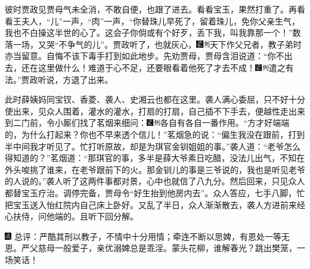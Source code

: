 彼时贾政见贾母气未全消，不敢自便，也跟了进去。看看宝玉，果然打重了。再看看王夫人，``儿''一声，``肉''一声，``你替珠儿早死了，留着珠儿，免你父亲生气，我也不白操这半世的心了。这会子你倘或有个好歹，丢下我，叫我靠那一个！''数落一场，又哭``不争气的儿''。贾政听了，也就灰心，{\includegraphics[width=3mm]{../Images/00006}\includegraphics[width=3mm]{../Images/00011}\footnotesize \kaishu 天下作父兄者，教子弟时亦当留意。}自悔不该下毒手打到如此地步。先劝贾母，贾母含泪说道：``你不出去，还在这里做什么！难道于心不足，还要眼看着他死了才去不成！{\includegraphics[width=3mm]{../Images/00006}\includegraphics[width=3mm]{../Images/00011}\footnotesize \kaishu 遣之有法。}''贾政听说，方退了出来。

此时薛姨妈同宝钗、香菱、袭人、史湘云也都在这里。袭人满心委屈，只不好十分使出来，见众人围着，灌水的灌水，打扇的打扇，自己插不下手去，便越性走出来到二门前，令小厮们找了茗烟来细问：{\includegraphics[width=3mm]{../Images/00006}\includegraphics[width=3mm]{../Images/00011}\footnotesize \kaishu 各自有各自一番作用。}``方才好端端的，为什么打起来？你也不早来透个信儿！''茗烟急的说：``偏生我没在跟前，打到半中间我才听见了。忙打听原故，却是为琪官金钏姐姐的事。''袭人道：``老爷怎么得知道的？''茗烟道：``那琪官的事，多半是薛大爷素日吃醋，没法儿出气，不知在外头唆挑了谁来，在老爷跟前下的火。那金钏儿的事是三爷说的，我也是听见老爷的人说的。''袭人听了这两件事都对景，心中也就信了八九分。然后回来，只见众人都替宝玉疗治。调停完备，贾母令``好生抬到他房内去''。众人答应，七手八脚，忙把宝玉送入怡红院内自己床上卧好。又乱了半日，众人渐渐散去，袭人方进前来经心扶侍，问他端的。且听下回分解。

{\includegraphics[width=3mm]{../Images/00005}  \kaishu 总评：严酷其刑以教子，不情中十分用情；牵连不断以思婢，有恩处一等无恩。严父慈母一般爱子，亲优溺婢总是乖淫。蒙头花柳，谁解春光？跳出樊笼，一场笑话！}

